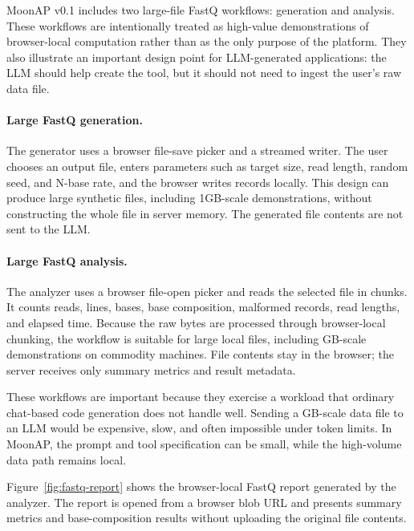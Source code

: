 \documentclass[11pt]{article}
\newcommand{\moonap}{MoonAP}
\begin{document}
\moonap{} v0.1 includes two large-file FastQ workflows: generation and analysis. These workflows are intentionally treated as high-value demonstrations of browser-local computation rather than as the only purpose of the platform. They also illustrate an important design point for LLM-generated applications: the LLM should help create the tool, but it should not need to ingest the user's raw data file.

\paragraph{Large FastQ generation.}
The generator uses a browser file-save picker and a streamed writer. The user chooses an output file, enters parameters such as target size, read length, random seed, and N-base rate, and the browser writes records locally. This design can produce large synthetic files, including 1GB-scale demonstrations, without constructing the whole file in server memory. The generated file contents are not sent to the LLM.

\paragraph{Large FastQ analysis.}
The analyzer uses a browser file-open picker and reads the selected file in chunks. It counts reads, lines, bases, base composition, malformed records, read lengths, and elapsed time. Because the raw bytes are processed through browser-local chunking, the workflow is suitable for large local files, including GB-scale demonstrations on commodity machines. File contents stay in the browser; the server receives only summary metrics and result metadata.

These workflows are important because they exercise a workload that ordinary chat-based code generation does not handle well. Sending a GB-scale data file to an LLM would be expensive, slow, and often impossible under token limits. In \moonap{}, the prompt and tool specification can be small, while the high-volume data path remains local.

Figure~\ref{fig:fastq-report} shows the browser-local FastQ report generated by the analyzer. The report is opened from a browser blob URL and presents summary metrics and base-composition results without uploading the original file contents.
\end{document}
